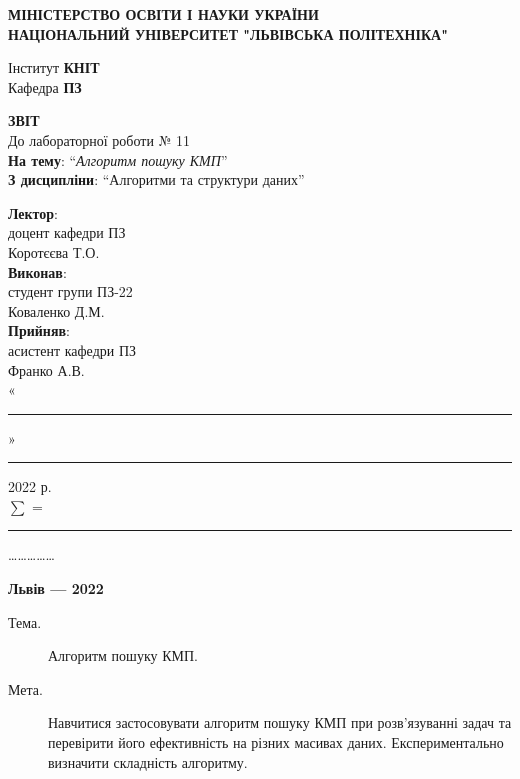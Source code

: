 \documentclass{article}
\newcommand\subject{Алгоритми та структури даних}
\newcommand\lecturer{доцент кафедри ПЗ\\Коротєєва Т.О.}
\newcommand\teacher{асистент кафедри ПЗ\\Франко А.В.}
\newcommand\mygroup{ПЗ-22}
\newcommand\lab{11}
\newcommand\theme{Алгоритм пошуку КМП}
\newcommand\purpose{Навчитися застосовувати алгоритм пошуку КМП при розв’язуванні задач та перевірити його ефективність на різних масивах даних. Експериментально визначити складність алгоритму}
\begin{document}
	\begin{normalsize}
		\begin{titlepage}
			\thispagestyle{empty}
			\begin{center}
				\textbf{МІНІСТЕРСТВО ОСВІТИ І НАУКИ УКРАЇНИ\\
					НАЦІОНАЛЬНИЙ УНІВЕРСИТЕТ "ЛЬВІВСЬКА ПОЛІТЕХНІКА"}
			\end{center}
			\begin{flushright}
				Інститут \textbf{КНІТ}\\
				Кафедра \textbf{ПЗ}
			\end{flushright}
			\vspace{200pt}
			\begin{center}
				\textbf{ЗВІТ}\\
				\vspace{10pt}
				До лабораторної роботи № \lab\\
				\textbf{На тему}: “\textit{\theme}”\\
				\textbf{З дисципліни}: “\subject”
			\end{center}
			\vspace{112pt}
			\begin{flushright}
				
				\textbf{Лектор}:\\
				\lecturer\\
				\vspace{28pt}
				\textbf{Виконав}:\\
				
				студент групи \mygroup\\
				Коваленко Д.М.\\
				\vspace{28pt}
				\textbf{Прийняв}:\\
				
				\teacher\\
				
				\vspace{28pt}
				«\rule{1cm}{0.15mm}» \rule{1.5cm}{0.15mm} 2022 р.\\
				$\sum$ = \rule{1cm}{0.15mm}……………\\
				
			\end{flushright}
			\vspace{\fill}
			\begin{center}
				\textbf{Львів — 2022}
			\end{center}
		\end{titlepage}
		
		\begin{description}
			\item[Тема.] \theme.
			\item[Мета.] \purpose.
		\end{description}
		

\end{normalsize}
\end{document}
